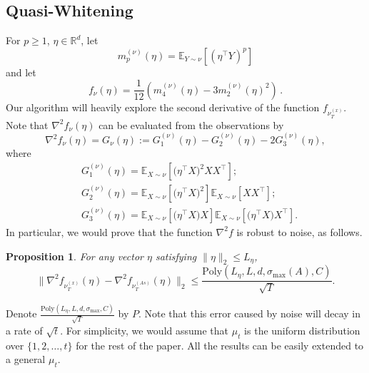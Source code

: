 \documentclass[twoside]{article}
\newcommand{\E}{\mathbb{E}}
\newcommand{\real}{\mathbb{R}}
\newtheorem{prop}[lemma]{Proposition}
\theoremstyle{definition}
\begin{document}
\subsection{Quasi-Whitening}
For $p\ge 1$, $\eta\in \real^d$, 
let 
\begin{equation}
\label{eq:momnent}
m_p^{(\nu)}(\eta) = \E_{Y\sim \nu}[ (\eta^\top Y)^p ]
\end{equation}
and let
\begin{equation}
\label{eq:funcf}
f_{\nu}(\eta) = \frac1{12} \left( m_4^{(\nu)}(\eta) - 3 m_2^{(\nu)}(\eta)^2 \right)\,.
\end{equation}
Our algorithm will heavily explore the second derivative of the function $f_{\nu_T^{(x)}}$. 
Note that $\nabla^2f_{\nu}(\eta)$  can be evaluated from the observations by
\begin{equation}
\label{eq:G}
\nabla^2 f_{\nu}(\eta) = G_{\nu}(\eta):= G_1^{(\nu)}(\eta) - G_2^{(\nu)}(\eta) -2G_3^{(\nu)}(\eta),
\end{equation}
where 
\vspace{-3mm}
\begin{align*}
& G_1^{(\nu)}(\eta) =  \E_{X\sim \nu} [\big(\eta^{\top}X\big)^2XX^{\top}]; \\
& G_2^{(\nu)}(\eta) = \E_{X\sim \nu} [\big(\eta^{\top}X\big)^2] \E_{X\sim \nu} [XX^{\top}]; \\
& G_3^{(\nu)}(\eta) = \E_{X\sim \nu} [\big(\eta^{\top}X\big)X] \E_{X\sim \nu} [\big(\eta^{\top}X\big)X^{\top}].
\end{align*} 
In particular, we would prove that the function $\nabla^2f$ is robust to noise, as follows. 
\begin{prop}
\label{prop:denoise}
For any vector $\eta$ satisfying $\|\eta\|_2\le L_{\eta}$,
\[
\| \nabla^2f_{\nu_T^{(x)}}(\eta) - \nabla^2f_{\nu_T^{(As)}}(\eta) \|_2 \le \frac{\text{Poly}(L_{\eta}, L, d, \sigma_{\max}(A), C)}{\sqrt{T}}. 
\] 
\end{prop}  
Denote $\frac{\text{Poly}(L_{\eta}, L, d, \sigma_{\max}, C)}{\sqrt{T}}$ by $P$. Note that this error caused by noise will decay in a rate of $\sqrt{t}$.
For simplicity, we would assume that $\mu_t$ is the uniform distribution over $\{1,2,\ldots, t\}$ for the rest of the paper.
All the results can be easily extended to a general $\mu_t$. 
\end{document}
